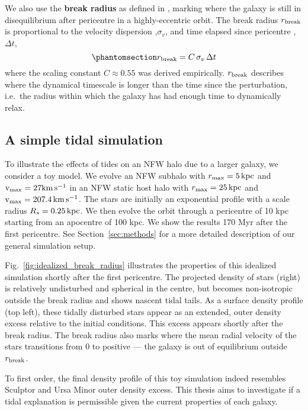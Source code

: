 We also use the \textbf{break radius} as defined in
\citet{penarrubia+2009}, marking where the galaxy is still in
disequilibrium after pericentre in a highly-eccentric orbit. The break
radius \(r_{\rm break}\) is proportional to the velocity dispersion
,\(\sigma_v\), and time elapsed since pericentre ,\(\Delta t\),
\begin{equation}\protect\phantomsection\label{eq:r_break}{
r_{\rm break} = C\,\sigma_{v}\,\Delta t
}\end{equation} where the scaling constant \(C \approx 0.55\) was
derived empirically. \(r_{\rm break}\) describes where the dynamical
timescale is longer than the time since the perturbation, i.e.~the
radius within which the galaxy has had enough time to dynamically relax.

\subsection{A simple tidal simulation}\label{a-simple-tidal-simulation}

To illustrate the effects of tides on an NFW halo due to a larger
galaxy, we consider a toy model. We evolve an NFW subhalo with
\(r_{\rm max}=5\,{\rm kpc}\) and \({\rm v}_{\rm max} = 27{\rm km\,s^{-1}}\) in an NFW static host halo with
\(r_{\rm max}=25\,{\rm kpc}\) and \({\rm v}_{\rm max} = 207.4\,{\rm km\,s^{-1}}\). The stars are initially
an exponential profile with a scale radius \(R_s=0.25\,{\rm kpc}\). We then
evolve the orbit through a pericentre of 10 kpc starting from an
apocentre of 100 kpc. We show the results 170 Myr after the first
pericentre. See Section~\ref{sec:methods} for a more detailed
description of our general simulation setup.

Fig.~\ref{fig:idealized_break_radius} illustrates the properties of this
idealized simulation shortly after the first pericentre. The projected
density of stars (right) is relatively undisturbed and spherical in the
centre, but becomes non-isotropic outside the break radius and shows
nascent tidal tails. As a surface density profile (top left), these
tidally disturbed stars appear as an extended, outer density excess
relative to the initial conditions. This excess appears shortly after
the break radius. The break radius also marks where the mean radial
velocity of the stars transitions from 0 to positive --- the galaxy is
out of equilibrium outside \(r_{\rm break}\).

To first order, the final density profile of this toy simulation indeed
resembles Sculptor and Ursa Minor outer density excess. This thesis aims
to investigate if a tidal explanation is permissible given the current
properties of each galaxy.

